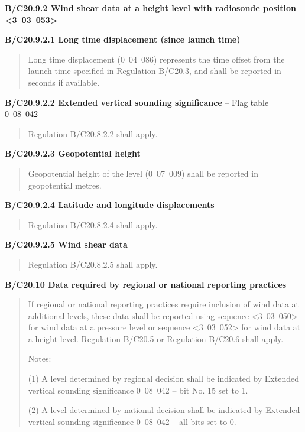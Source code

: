 \textbf{B/C20.9.2 Wind shear data at a height level with radiosonde position \textless3~03~053\textgreater{}}

\textbf{B/C20.9.2.1 Long time displacement (since launch time)}

\begin{quote}
Long time displacement (0~04~086) represents the time offset from the launch time specified in Regulation B/C20.3, and shall be reported in seconds if available.
\end{quote}

\textbf{B/C20.9.2.2 Extended vertical sounding significance} -- Flag table 0~08~042

\begin{quote}
Regulation B/C20.8.2.2 shall apply.
\end{quote}

\textbf{B/C20.9.2.3 Geopotential height}

\begin{quote}
Geopotential height of the level (0~07~009) shall be reported in geopotential metres.
\end{quote}

\textbf{B/C20.9.2.4 Latitude and longitude displacements}

\begin{quote}
Regulation B/C20.8.2.4 shall apply.
\end{quote}

\textbf{B/C20.9.2.5 Wind shear data}

\begin{quote}
Regulation B/C20.8.2.5 shall apply.
\end{quote}

\textbf{B/C20.10 Data required by regional or national reporting practices}

\begin{quote}
If regional or national reporting practices require inclusion of wind data at additional levels, these data shall be reported using sequence \textless3~03~050\textgreater{} for wind data at a pressure level or sequence \textless3~03~052\textgreater{} for wind data at a height level. Regulation B/C20.5 or Regulation B/C20.6 shall apply.

Notes:

(1) A level determined by regional decision shall be indicated by Extended vertical sounding significance 0~08~042 -- bit No. 15 set to 1.

(2) A level determined by national decision shall be indicated by Extended vertical sounding significance 0~08~042 -- all bits set to 0.
\end{quote}

